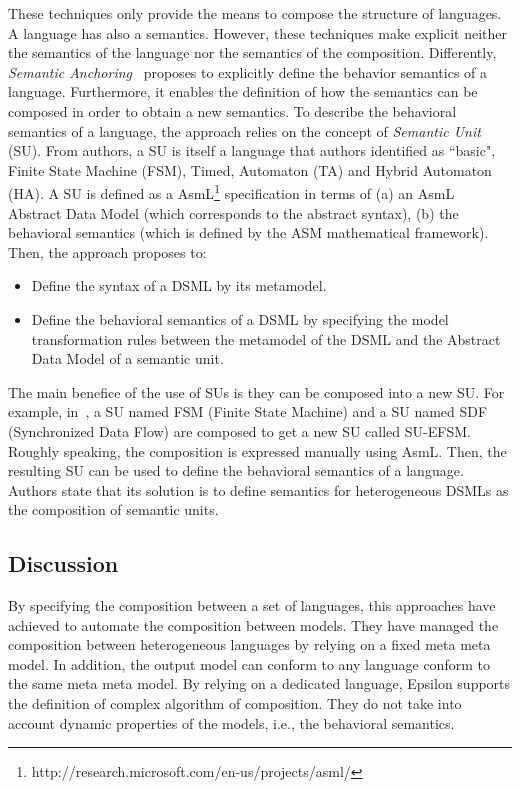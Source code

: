 These techniques only provide the means to compose the structure of languages. A language has also a semantics. However, these techniques make explicit neither the semantics of the language nor the semantics of the composition. Differently, \emph{Semantic Anchoring}~\cite{semanticsanchoring} proposes to explicitly define the behavior semantics of a language. Furthermore, it enables the definition of how the semantics can be composed in order to obtain a new semantics. To describe the behavioral semantics of a language, the approach relies on the concept of \emph{Semantic Unit} (SU). From authors, a SU is itself a language that authors identified as ``basic", \eg Finite State Machine (FSM), Timed, Automaton (TA) and Hybrid Automaton (HA). A SU is defined as a AsmL\footnote{http://research.microsoft.com/en-us/projects/asml/} specification in terms of (a) an AsmL Abstract Data Model (which corresponds to the abstract syntax), (b) the behavioral semantics (which is defined by the ASM mathematical framework). Then, the approach proposes to:
\begin{itemize}
	\item Define the syntax of a DSML by its metamodel. 
	\item Define the behavioral semantics of a DSML by specifying the model transformation rules between the metamodel of the DSML and the Abstract Data Model of a semantic unit. 
\end{itemize}    
The main benefice of the use of SUs is they can be composed into a new SU. For example, in~\cite{composemanticanch}, a SU named FSM (Finite State Machine) and a SU named SDF (Synchronized Data Flow) are composed to get a new SU called SU-EFSM. Roughly speaking, the composition is expressed manually using AsmL. Then, the resulting SU can be used to define the behavioral semantics of a language. Authors state that its solution is to define semantics for heterogeneous DSMLs as the composition of semantic units. 

\subsection{Discussion}
By specifying the composition between a set of languages, this approaches have achieved to automate the composition between models. They have managed the composition between heterogeneous languages by relying on a fixed meta meta model. In addition, the output model can conform to any language conform to the same meta meta model. By relying on a dedicated language, Epsilon supports the definition of complex algorithm of composition. They do not take into account dynamic properties of the models, i.e., the behavioral semantics.  

